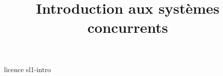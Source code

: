 \documentclass {beamer}
\title {Introduction aux systèmes concurrents}
\begin{document}
 {licence}
 {sl1-intro}
\end{document}
